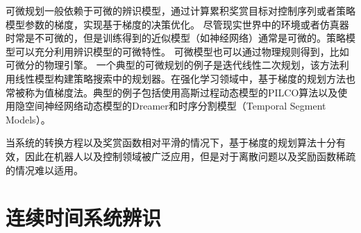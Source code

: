 可微规划一般依赖于可微的辨识模型，通过计算累积奖赏目标对控制序列或者策略模型参数的梯度，实现基于梯度的决策优化。
尽管现实世界中的环境或者仿真器时常是不可微的，但是训练得到的近似模型（如神经网络）通常是可微的。策略模型可以充分利用辨识模型的可微特性。
可微模型也可以通过物理规则得到，比如可微分的物理引擎\cite{degrave2019differentiable,de2018end}。
一个典型的可微规划的例子是迭代线性二次规划，该方法利用线性模型构建策略搜索中的规划器\cite{NIPS2014_6766aa27}。在强化学习领域中，基于梯度的规划方法也常被称为值梯度法。典型的例子包括使用高斯过程动态模型的PILCO算法\cite{deisenroth2011pilco}以及使用隐空间神经网络动态模型的Dreamer\cite{hafner2019dream}和时序分割模型（Temporal Segment Models）\cite{mishra2017prediction}。

当系统的转换方程以及奖赏函数相对平滑的情况下，基于梯度的规划算法十分有效，因此在机器人以及控制领域被广泛应用，但是对于离散问题以及奖励函数稀疏的情况难以适用。


\section{连续时间系统辨识}

